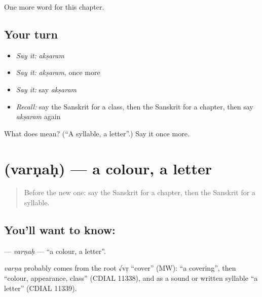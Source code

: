 \begin{grammarlens}[title={What you've built}]
One more word for this chapter.
\end{grammarlens}

\subsection*{Your turn}
\begin{itemize}
\raggedright
  \item \emph{Say it:} \emph{akṣaram}
  \item \emph{Say it:} \emph{akṣaram}, once more
  \item \emph{Say it:} say \emph{akṣaram}
  \item \emph{Recall:} say the Sanskrit for a class, then the Sanskrit for a chapter, then say \emph{akṣaram} again
\end{itemize}

\begin{tcolorbox}[breakable,colback=teal!4,colframe=teal!35!black,title={Before you move on}]
What does  mean? (\textquotedblleft{}A syllable, a letter\textquotedblright{}.) Say it once more.
\end{tcolorbox}
\section[\texorpdfstring{\sk{वर्णः} (varṇaḥ)}{वर्णः (varṇaḥ)}]{ (varṇaḥ) — a colour, a letter}

\label{lesson:SA-C168-varnah}



\begin{quote}
Before the new one: say the Sanskrit for a chapter, then the Sanskrit for a syllable.
\end{quote}

\subsection*{You'll want to know: }
\textbf{} — \emph{varṇaḥ} — \textquotedblleft{}a colour, a letter\textquotedblright{}.

\begin{cousinweb}
\emph{varṇa} probably comes from the root √vṛ \textquotedblleft{}cover\textquotedblright{} (MW): \textquotedblleft{}a covering\textquotedblright{}, then \textquotedblleft{}colour, appearance, class\textquotedblright{} (CDIAL 11338), and as a sound or written syllable \textquotedblleft{}a letter\textquotedblright{} (CDIAL 11339).
\end{cousinweb}

